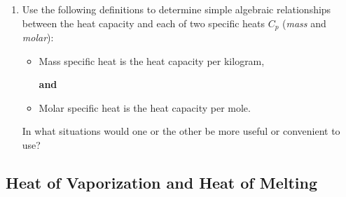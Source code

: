 \begin{enumerate}
		
	\item Use the following definitions to determine simple algebraic relationships between the heat capacity and each of two specific heats $C_p$ (\emph{mass} and \emph{molar}): 
	
	\begin{itemize}
		\item Mass specific heat is the heat capacity per kilogram,
		
		\textbf{and}
		
		\item Molar specific heat is the heat capacity per mole.
	\end{itemize}	

	In what situations would one or the other be more useful or convenient to use?
		
\end{enumerate}

\subsection{Heat of Vaporization and Heat of Melting}
\label{1.2.1B}

